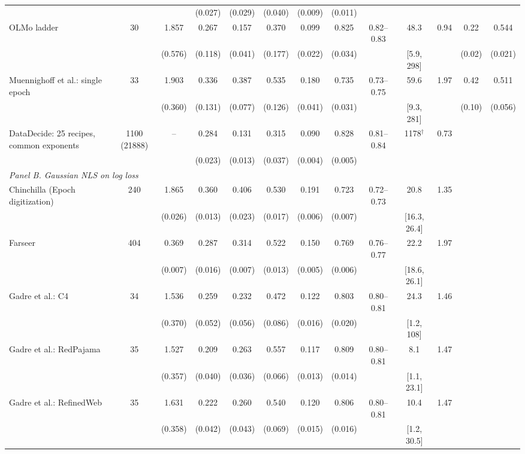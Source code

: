 \begin{landscape}
\begin{table}[!htbp]
\begin{threeparttable}
\begin{tabular}{lcccccccccccc}
 &  &  & (0.027) & (0.029) & (0.040) & (0.009) & (0.011) &  &  &  &  &  \\[2pt]
OLMo ladder & 30 & 1.857 & 0.267 & 0.157 & 0.370 & 0.099 & 0.825 & 0.82--0.83 & 48.3 & 0.94 & 0.22 & 0.544 \\
 &  & (0.576) & (0.118) & (0.041) & (0.177) & (0.022) & (0.034) &  & [5.9, 298] &  & (0.02) & (0.021) \\[2pt]
Muennighoff et al.: single epoch & 33 & 1.903 & 0.336 & 0.387 & 0.535 & 0.180 & 0.735 & 0.73--0.75 & 59.6 & 1.97 & 0.42 & 0.511 \\
 &  & (0.360) & (0.131) & (0.077) & (0.126) & (0.041) & (0.031) &  & [9.3, 281] &  & (0.10) & (0.056) \\[2pt]
DataDecide: 25 recipes, common exponents & 1100 (21888) & -- & 0.284 & 0.131 & 0.315 & 0.090 & 0.828 & 0.81--0.84 & 1178$^\dagger$ & 0.73 &  &  \\
 &  &  & (0.023) & (0.013) & (0.037) & (0.004) & (0.005) &  &  &  &  &  \\[2pt]
\midrule
\multicolumn{13}{l}{\textit{Panel B. Gaussian NLS on log loss}} \\
Chinchilla (Epoch digitization) & 240 & 1.865 & 0.360 & 0.406 & 0.530 & 0.191 & 0.723 & 0.72--0.73 & 20.8 & 1.35 &  &  \\
 &  & (0.026) & (0.013) & (0.023) & (0.017) & (0.006) & (0.007) &  & [16.3, 26.4] &  &  &  \\[2pt]
Farseer & 404 & 0.369 & 0.287 & 0.314 & 0.522 & 0.150 & 0.769 & 0.76--0.77 & 22.2 & 1.97 &  &  \\
 &  & (0.007) & (0.016) & (0.007) & (0.013) & (0.005) & (0.006) &  & [18.6, 26.1] &  &  &  \\[2pt]
Gadre et al.: C4 & 34 & 1.536 & 0.259 & 0.232 & 0.472 & 0.122 & 0.803 & 0.80--0.81 & 24.3 & 1.46 &  &  \\
 &  & (0.370) & (0.052) & (0.056) & (0.086) & (0.016) & (0.020) &  & [1.2, 108] &  &  &  \\[2pt]
Gadre et al.: RedPajama & 35 & 1.527 & 0.209 & 0.263 & 0.557 & 0.117 & 0.809 & 0.80--0.81 & 8.1 & 1.47 &  &  \\
 &  & (0.357) & (0.040) & (0.036) & (0.066) & (0.013) & (0.014) &  & [1.1, 23.1] &  &  &  \\[2pt]
Gadre et al.: RefinedWeb & 35 & 1.631 & 0.222 & 0.260 & 0.540 & 0.120 & 0.806 & 0.80--0.81 & 10.4 & 1.47 &  &  \\
 &  & (0.358) & (0.042) & (0.043) & (0.069) & (0.015) & (0.016) &  & [1.2, 30.5] &  &  &  \\[2pt]

\end{tabular}
\end{threeparttable}
\end{table}
\end{landscape}
